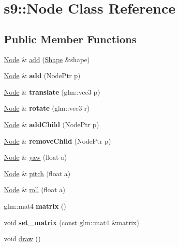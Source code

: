 \hypertarget{classs9_1_1Node}{\section{s9\-:\-:\-Node \-Class \-Reference}
\label{classs9_1_1Node}
}
\subsection*{\-Public \-Member \-Functions}
\begin{DoxyCompactItemize}
\item 
\hyperlink{classs9_1_1Node}{\-Node} \& \hyperlink{classs9_1_1Node_ae75a24d598fed1d8cb265d7bd1f250a6}{add} (\hyperlink{classs9_1_1Shape}{\-Shape} \&shape)
\item 
\hypertarget{classs9_1_1Node_ac117bf8d7dbe445240a54a58b71d02fb}{\hyperlink{classs9_1_1Node}{\-Node} \& {\bfseries add} (\-Node\-Ptr p)}\label{classs9_1_1Node_ac117bf8d7dbe445240a54a58b71d02fb}

\item 
\hypertarget{classs9_1_1Node_a7ef334d59ddd6f2e0db167d955f00419}{\hyperlink{classs9_1_1Node}{\-Node} \& {\bfseries translate} (glm\-::vec3 p)}\label{classs9_1_1Node_a7ef334d59ddd6f2e0db167d955f00419}

\item 
\hypertarget{classs9_1_1Node_a0226fc806528f8a13d72589d97b35048}{\hyperlink{classs9_1_1Node}{\-Node} \& {\bfseries rotate} (glm\-::vec3 r)}\label{classs9_1_1Node_a0226fc806528f8a13d72589d97b35048}

\item 
\hypertarget{classs9_1_1Node_a9a558e14ea69bc090749140bc416ac63}{\hyperlink{classs9_1_1Node}{\-Node} \& {\bfseries add\-Child} (\-Node\-Ptr p)}\label{classs9_1_1Node_a9a558e14ea69bc090749140bc416ac63}

\item 
\hypertarget{classs9_1_1Node_a3f9b1b74aa4d81cabd30e54e3fbcc463}{\hyperlink{classs9_1_1Node}{\-Node} \& {\bfseries remove\-Child} (\-Node\-Ptr p)}\label{classs9_1_1Node_a3f9b1b74aa4d81cabd30e54e3fbcc463}

\item 
\hyperlink{classs9_1_1Node}{\-Node} \& \hyperlink{classs9_1_1Node_abf84276da34f295abef63302b530951c}{yaw} (float a)
\item 
\hyperlink{classs9_1_1Node}{\-Node} \& \hyperlink{classs9_1_1Node_a3227e4a745619e0f44a19df3576b8e65}{pitch} (float a)
\item 
\hyperlink{classs9_1_1Node}{\-Node} \& \hyperlink{classs9_1_1Node_a9ce12695e88691b8e8e0689347e0ced6}{roll} (float a)
\item 
\hypertarget{classs9_1_1Node_af568af42d07be9eee5bb77d637686125}{glm\-::mat4 {\bfseries matrix} ()}\label{classs9_1_1Node_af568af42d07be9eee5bb77d637686125}

\item 
\hypertarget{classs9_1_1Node_aca2590950f64f43f37b7999cd4e26bcf}{void {\bfseries set\-\_\-matrix} (const glm\-::mat4 \&matrix)}\label{classs9_1_1Node_aca2590950f64f43f37b7999cd4e26bcf}

\item 
void \hyperlink{classs9_1_1Node_ab88c83ced58700a56de568f5b1e3c473}{draw} ()
\end{DoxyCompactItemize}

